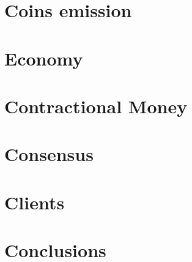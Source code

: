 \documentclass[]{article}
\begin{document}

    \section{Coins emission}


    \section{Economy}


    \section{Contractional Money}



    \section{Consensus}


    \section{Clients}


    \section{Conclusions}

    
\end{document}
